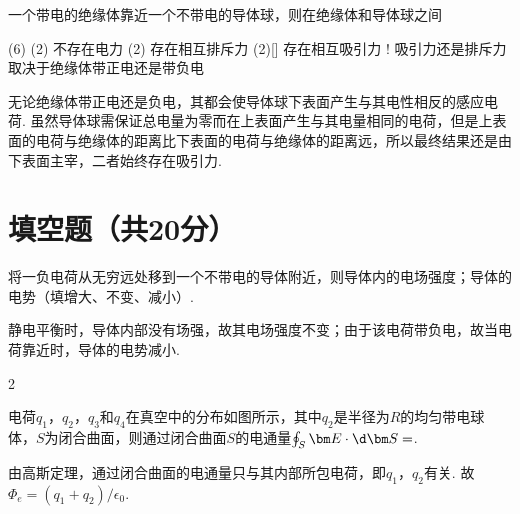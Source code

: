 \begin{problem}
    一个带电的绝缘体靠近一个不带电的导体球，则在绝缘体和导体球之间
    \begin{tasks}(6)
        \task*(2) 不存在电力
        \task*(2) 存在相互排斥力
        \task*(2)[\true] 存在相互吸引力
        \task! 吸引力还是排斥力取决于绝缘体带正电还是带负电
    \end{tasks}
\end{problem}
\begin{solution}
    无论绝缘体带正电还是负电，其都会使导体球下表面产生与其电性相反的感应电荷. 虽然导体球需保证总电量为零而在上表面产生与其电量相同的电荷，但是上表面的电荷与绝缘体的距离比下表面的电荷与绝缘体的距离远，所以最终结果还是由下表面主宰，二者始终存在吸引力.
\end{solution}

\section{填空题（共20分）}

\begin{problem}
    将一负电荷从无穷远处移到一个不带电的导体附近，则导体内的电场强度；导体的电势（填增大、不变、减小）.
\end{problem}
\begin{solution}
    静电平衡时，导体内部没有场强，故其电场强度不变；由于该电荷带负电，故当电荷靠近时，导体的电势减小.
\end{solution}

\begin{paracol}{2}
\begin{problem}
    电荷$q_1$，$q_2$，$q_3$和$q_4$在真空中的分布如图所示，其中$q_2$是半径为$R$的均匀带电球体，$S$为闭合曲面，则通过闭合曲面$S$的电通量$\oint_S{\bm E\cdot\d\bm S}=$.
    \switchcolumn\vspace*{\fill}\centering
    \vspace*{\fill}
\end{problem}\switchcolumn
{}
\begin{solution}
    由高斯定理，通过闭合曲面的电通量只与其内部所包电荷，即$q_1$，$q_2$有关. 故$\Phi_e=(q_1+q_2)/\epsilon_0$.
\end{solution}
\end{paracol}

